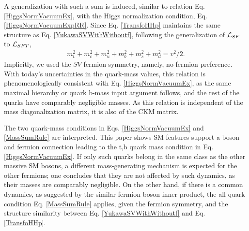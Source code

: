 \documentclass[12pt]{article}
\renewcommand\[{\begin{dmath}}
\renewcommand\]{\end{dmath}}
\begin{document}
 A   generalization  with  such a sum is induced,  similar to relation Eq.    \ref{HiggsNormVacuumEx},  with the  Higgs normalization condition, Eq. \ref{HiggsNormVacuumExpRR}. Since
    Eq. \ref {TransfoHHp} maintains the same structure as Eq.  \ref{YukawaSVWithWithoutf}, following the
  generalization of ${\cal L}_{SF}$    to ${\cal L}_{SFT}$,
\begin{eqnarray}
\label  {MassSumRule}
m_t^2+m_c^2+m_u^2+m_b^2+m_s^2+m_d^2=v^2/2.
  \end{eqnarray}
Implicitly,   we used the $SV$-fermion symmetry, namely, no  fermion  preference.
  With today's uncertainties in the quark-mass values, this relation is phenomenologically consistent with
  Eq. \ref{HiggsNormVacuumEx}, as the  same maximal hierarchy or quark b-mass input argument follows,  and  the rest of the quarks have comparably negligible masses. As this  relation is independent of the mass diagonalization matrix, it is also of the CKM matrix\cite{KobayashiMaskawa}.










The two quark-mass conditions in  Eqs. \ref{HiggsNormVacuumEx} and  \ref{MassSumRule} are  interpreted.  This paper shows SM features support a boson and fermion connection leading to the t,b quark mass condition in  Eq. \ref{HiggsNormVacuumEx}.   If only  such quarks belong in the same
class as the other  massive SM bosons,  a    different mass-generating mechanism  is expected for the other fermions; one   concludes   that they    are not affected by such dynamics, as  their masses are comparably negligible.
On the other hand, if there is a common dynamics, as suggested by the similar fermion-boson inner product,  the  all-quark condition Eq. \ref{MassSumRule} applies, given the fermion symmetry, and
   the structure similarity between Eq.   \ref{YukawaSVWithWithoutf}   and   Eq.  \ref{TransfoHHp}.
\end{document}
